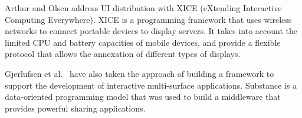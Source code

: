 Arthur and Olsen \citeyearpar{Arthur:2011:xice} address UI distribution with XICE (eXtending Interactive Computing Everywhere).
XICE is a programming framework that uses wireless networks to connect portable devices to display servers.
It takes into account the limited CPU and battery capacities of mobile devices, and provide a flexible protocol that allows the annexation of different types of displays.

Gjerlufsen et al.\ \citeyearpar{Gjerlufsen:2011:substance} have also taken the approach of building a framework to support the development of interactive multi-surface applications.
Substance is a data-oriented programming model that was used to build a middleware that provides powerful sharing applications.





